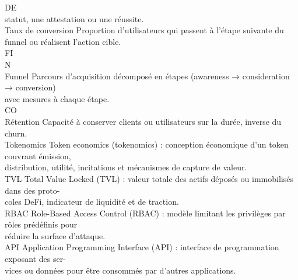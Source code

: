 \vspace{0.5em}
DE\\
statut, une attestation ou une réussite.\\
\vspace{0.5em}
Taux de conversion                      Proportion d’utilisateurs qui passent à l’étape suivante du funnel ou réalisent l’action cible.\\
\vspace{0.5em}
\vspace{0.5em}
\vspace{0.5em}
\vspace{0.5em}
FI\\
N\\
Funnel                                  Parcours d’acquisition décomposé en étapes (awareness → consideration → conversion)\\
avec mesures à chaque étape.\\
CO\\
Rétention                               Capacité à conserver clients ou utilisateurs sur la durée, inverse du churn.\\
\vspace{0.5em}
Tokenomics                              Token economics (tokenomics) : conception économique d’un token couvrant émission,\\
distribution, utilité, incitations et mécanismes de capture de valeur.\\
\vspace{0.5em}
TVL                                     Total Value Locked (TVL) : valeur totale des actifs déposés ou immobilisés dans des proto-\\
coles DeFi, indicateur de liquidité et de traction.\\
\vspace{0.5em}
RBAC                                    Role-Based Access Control (RBAC) : modèle limitant les privilèges par rôles prédéfinis pour\\
réduire la surface d’attaque.\\
\vspace{0.5em}
API                                     Application Programming Interface (API) : interface de programmation exposant des ser-\\
vices ou données pour être consommés par d’autres applications.\\
\vspace{0.5em}
\vspace{0.5em}
\vspace{0.5em}
